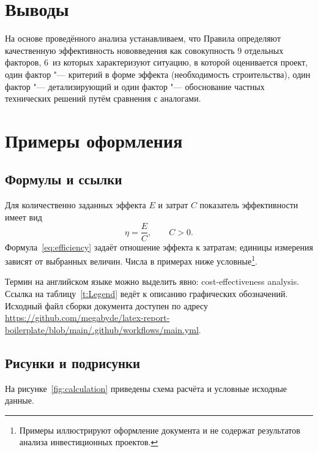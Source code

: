 \documentclass[a4paper, 12pt, numbers=enddot]{scrartcl}
\begin{document}
\section{Выводы}
На основе проведённого анализа устанавливаем, что Правила определяют
качественную эффективность нововведения как совокупность 9 отдельных факторов,
6~из которых характеризуют ситуацию, в которой оценивается проект, один фактор
"--- критерий в форме эффекта (необходимость строительства), один фактор "---
детализирующий и один фактор "--- обоснование частных технических решений путём
сравнения с аналогами.

\clearpage
\appendix
\section{Примеры оформления}

\subsection{Формулы и ссылки}
Для количественно заданных эффекта $E$ и затрат $C$ показатель эффективности
имеет вид
\begin{equation}
  \eta = \frac{E}{C}, \qquad C > 0.
  \label{eq:efficiency}
\end{equation}
Формула~\eqref{eq:efficiency} задаёт отношение эффекта к затратам; единицы
измерения зависят от выбранных величин. Числа в примерах ниже условные\footnote{
  Примеры иллюстрируют оформление документа и не содержат результатов анализа
  инвестиционных проектов.}.

Термин на английском языке можно выделить явно:
\foreignlanguage{english}{cost-effectiveness analysis}.
Ссылка на таблицу~\ref{t:Legend} ведёт к описанию графических обозначений.
Исходный файл сборки документа доступен по адресу
\url{https://github.com/megabyde/latex-report-boilerplate/blob/main/.github/workflows/main.yml}.

\subsection{Рисунки и подрисунки}
На рисунке~\ref{fig:calculation} приведены схема расчёта и условные исходные
данные.
\end{document}
